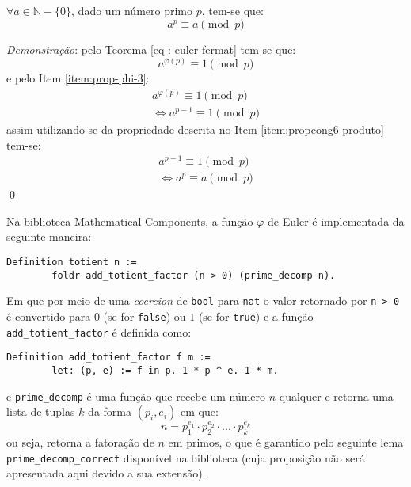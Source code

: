 \begin{teorema}
\label{eq : pequeno-fermat}
$\forall a \in \mathbb{N} - \{0\}$, dado um número primo $p$, tem-se que:
    \begin{equation*}
        a^p \equiv a \pmod{p}
    \end{equation*}
\end{teorema}

\noindent
\textit{Demonstração}: pelo Teorema \ref{eq : euler-fermat} tem-se que:
\begin{equation*}
    a^{\varphi(p)} \equiv 1 \pmod{p}
\end{equation*}
e pelo Item \ref{item:prop-phi-3}:
\begin{align*}
    a^{\varphi(p)} \equiv 1 \pmod{p}
    \\
    \Longleftrightarrow a^{p-1} \equiv 1 \pmod{p}
\end{align*}
assim utilizando-se da propriedade descrita no Item \ref{item:propcong6-produto} tem-se:
\begin{align*}
    a^{p-1} \equiv 1 \pmod{p}
    \\
    \Longleftrightarrow a^{p} \equiv a \pmod{p}
\end{align*} \qed

Na biblioteca Mathematical Components, a função $\varphi$ de Euler é implementada da seguinte maneira:
\begin{lstlisting}[language = coq]
    Definition totient n := 
        foldr add_totient_factor (n > 0) (prime_decomp n).
\end{lstlisting}
Em que por meio de uma \textit{coercion} de \lstinline[language = coq]{bool} para \lstinline[language = coq]{nat} o valor retornado por \lstinline[language = coq]{n > 0} é convertido para $0$ (se for \lstinline[language = coq]{false}) ou $1$ (se for \lstinline[language = coq]{true}) e a função \lstinline[language = coq]{add_totient_factor} é definida como:
\begin{lstlisting}[language = coq]
    Definition add_totient_factor f m := 
        let: (p, e) := f in p.-1 * p ^ e.-1 * m.
\end{lstlisting}
e \lstinline[language = coq]{prime_decomp} é uma função que recebe um número $n$ qualquer e retorna uma lista de tuplas $k$ da forma $(p_i, e_i)$ em que:
    \begin{equation*}
        n = p_1^{e_1} \cdot p_2^{e_2} \cdot ... \cdot p_k^{e_k}
    \end{equation*}
ou seja, retorna a fatoração de $n$ em primos, o que é garantido pelo seguinte lema \lstinline[language = coq]{prime_decomp_correct} disponível na biblioteca (cuja proposição não será apresentada aqui devido a sua extensão).

